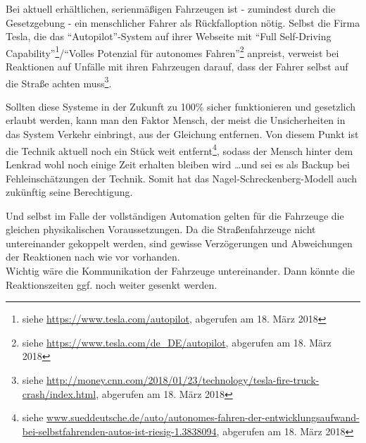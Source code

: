 Bei aktuell erhältlichen, serienmäßigen Fahrzeugen ist - zumindest durch die Gesetzgebung - ein menschlicher Fahrer als Rückfalloption nötig.
Selbst die Firma Tesla, die das \enquote{Autopilot}-System auf ihrer Webseite mit \enquote{Full Self-Driving Capability}\footnote{siehe \url{https://www.tesla.com/autopilot}, abgerufen am 18. März 2018}/\enquote{Volles Potenzial für autonomes Fahren}\footnote{siehe \url{https://www.tesla.com/de_DE/autopilot}, abgerufen am 18. März 2018} anpreist, verweist bei Reaktionen auf Unfälle mit ihren Fahrzeugen darauf, dass der Fahrer selbst auf die Straße achten muss\footnote{siehe \url{http://money.cnn.com/2018/01/23/technology/tesla-fire-truck-crash/index.html}, abgerufen am 18. März 2018}.

Sollten diese Systeme in der Zukunft zu 100\% sicher funktionieren und gesetzlich erlaubt werden, kann man den Faktor Mensch, der meist die Unsicherheiten in das System Verkehr einbringt, aus der Gleichung entfernen.
Von diesem Punkt ist die Technik aktuell noch ein Stück weit entfernt\footnote{siehe \url{www.sueddeutsche.de/auto/autonomes-fahren-der-entwicklungsaufwand-bei-selbstfahrenden-autos-ist-riesig-1.3838094}, abgerufen am 18. März 2018}, sodass der Mensch hinter dem Lenkrad wohl noch einige Zeit erhalten bleiben wird \ldots und sei es als Backup bei Fehleinschätzungen der Technik.
Somit hat das Nagel-Schreckenberg-Modell auch zukünftig seine Berechtigung.

Und selbst im Falle der vollständigen Automation gelten für die Fahrzeuge die gleichen physikalischen Voraussetzungen.
Da die Straßenfahrzeuge nicht untereinander gekoppelt werden, sind gewisse Verzögerungen und Abweichungen der Reaktionen nach wie vor vorhanden.
\\
Wichtig wäre die Kommunikation der Fahrzeuge untereinander.
Dann könnte die Reaktionszeiten ggf. noch weiter gesenkt werden.
